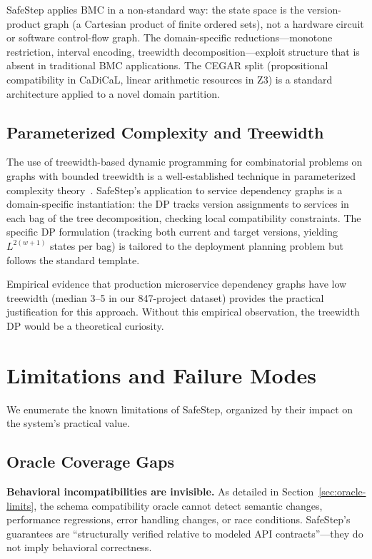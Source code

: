 \documentclass[10pt,twocolumn]{article}
\begin{document}
SafeStep applies BMC in a non-standard way: the state space is the version-product graph (a Cartesian product of finite ordered sets), not a hardware circuit or software control-flow graph. The domain-specific reductions---monotone restriction, interval encoding, treewidth decomposition---exploit structure that is absent in traditional BMC applications. The CEGAR split (propositional compatibility in CaDiCaL, linear arithmetic resources in Z3) is a standard architecture applied to a novel domain partition.

\subsection{Parameterized Complexity and Treewidth}
\label{sec:related-treewidth}

The use of treewidth-based dynamic programming for combinatorial problems on graphs with bounded treewidth is a well-established technique in parameterized complexity theory~\cite{bodlaender1996treewidth, cygan2015parameterized}. SafeStep's application to service dependency graphs is a domain-specific instantiation: the DP tracks version assignments to services in each bag of the tree decomposition, checking local compatibility constraints. The specific DP formulation (tracking both current and target versions, yielding $L^{2(w+1)}$ states per bag) is tailored to the deployment planning problem but follows the standard template.

Empirical evidence that production microservice dependency graphs have low treewidth (median 3--5 in our 847-project dataset) provides the practical justification for this approach. Without this empirical observation, the treewidth DP would be a theoretical curiosity.

\section{Limitations and Failure Modes}
\label{sec:limitations}

We enumerate the known limitations of SafeStep, organized by their impact on the system's practical value.

\subsection{Oracle Coverage Gaps}
\label{sec:limit-oracle}

\textbf{Behavioral incompatibilities are invisible.} As detailed in Section~\ref{sec:oracle-limits}, the schema compatibility oracle cannot detect semantic changes, performance regressions, error handling changes, or race conditions. SafeStep's guarantees are ``structurally verified relative to modeled API contracts''---they do not imply behavioral correctness.
\end{document}
